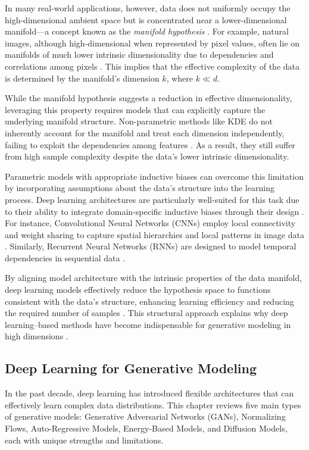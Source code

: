 In many real-world applications, however, data does not uniformly occupy the high-dimensional ambient space but is concentrated near a lower-dimensional manifold—a concept known as the \emph{manifold hypothesis} \cite{fefferman2016testing}. For example, natural images, although high-dimensional when represented by pixel values, often lie on manifolds of much lower intrinsic dimensionality due to dependencies and correlations among pixels \cite{roweis2000nonlinear}. This implies that the effective complexity of the data is determined by the manifold's dimension \( k \), where \( k \ll d \).

While the manifold hypothesis suggests a reduction in effective dimensionality, leveraging this property requires models that can explicitly capture the underlying manifold structure. Non-parametric methods like KDE do not inherently account for the manifold and treat each dimension independently, failing to exploit the dependencies among features \cite{tenenbaum2000global}. As a result, they still suffer from high sample complexity despite the data's lower intrinsic dimensionality.

Parametric models with appropriate inductive biases can overcome this limitation by incorporating assumptions about the data's structure into the learning process. Deep learning architectures are particularly well-suited for this task due to their ability to integrate domain-specific inductive biases through their design \cite{lecun2015deep}. For instance, Convolutional Neural Networks (CNNs) employ local connectivity and weight sharing to capture spatial hierarchies and local patterns in image data \cite{lecun1998gradient}. Similarly, Recurrent Neural Networks (RNNs) are designed to model temporal dependencies in sequential data \cite{hochreiter1997long}.

By aligning model architecture with the intrinsic properties of the data manifold, deep learning models effectively reduce the hypothesis space to functions consistent with the data's structure, enhancing learning efficiency and reducing the required number of samples \cite{poggio2017theory}. This structural approach explains why deep learning–based methods have become indispensable for generative modeling in high dimensions \cite{goodfellow2016deep,kingma2013auto}.
\subsection{Deep Learning for Generative Modeling}
In the past decade, deep learning has introduced flexible architectures that can effectively learn complex data distributions. This chapter reviews five main types of generative models: Generative Adversarial Networks (GANs), Normalizing Flows, Auto-Regressive Models, Energy-Based Models, and Diffusion Models, each with unique strengths and limitations.

